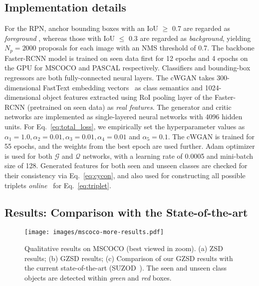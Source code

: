 \documentclass{bmvc2k}
\begin{document}
\subsection{Implementation details}
\label{sec:zsd1-imple}
For the RPN, anchor bounding boxes with an IoU $\geq$ 0.7 are regarded as \textit{foreground} , whereas those with IoU $\leq$ 0.3 are regarded as \textit{background}, yielding $N_p = 2000$ proposals for each image with an NMS threshold of 0.7. The backbone Faster-RCNN model is trained on seen data first for 12 epochs and 4 epochs on the GPU for MSCOCO and PASCAL respectively. Classifiers and bounding-box regressors are both fully-connected neural layers. The cWGAN takes 300-dimensional FastText embedding vectors~\cite{joulin-etal-2017-bag} as class semantics and 1024-dimensional object features extracted using RoI pooling layer of the Faster-RCNN (pretrained on seen data) as {\em real features}. The generator and critic networks are implemented as single-layered neural networks with 4096 hidden units. For Eq.~\ref{eq:total_loss}, we empirically set the hyperparameter values as $\alpha_1 = 1.0, \alpha_2 = 0.01, \alpha_3 = 0.01, \alpha_4 = 0.01$ and $\alpha_5 = 0.1$. 
The cWGAN is trained for 55 epochs, and the weights from the best epoch are used further. Adam optimizer is used for both $\mathcal{G}$ and $\mathcal{Q}$ networks, with a learning rate of 0.0005 and mini-batch size of 128. Generated features for both seen and unseen classes are checked for their consistency via Eq.~\ref{eq:cycon}, and also used for constructing all possible triplets {\em online}~\cite{schroff2015facenet} for Eq.~\ref{eq:triplet}.



\subsection{Results: Comparison with the State-of-the-art}
\label{sec:results}


\begin{figure}[t]
	\centering
	\texttt{[image: images/mscoco-more-results.pdf]}
	\caption{Qualitative results on MSCOCO (best viewed in zoom). (a) ZSD results; (b) GZSD results; (c) Comparison of our GZSD results with the current state-of-the-art (SUZOD~\cite{hayat2020synthesizing}). The seen and unseen class objects are detected within {\em green} and {\em red} boxes.}
	\label{fig:mscoco-results}
\end{figure}  
\end{document}
